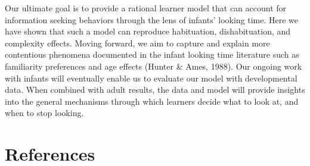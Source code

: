 \documentclass[10pt, letterpaper]{article}
\begin{document}
Our ultimate goal is to provide a rational learner model that can
account for information seeking behaviors through the lens of infants'
looking time. Here we have shown that such a model can reproduce
habituation, dishabituation, and complexity effects. Moving forward, we
aim to capture and explain more contentious phenomena documented in the
infant looking time literature such as familiarity preferences and age
effects (Hunter \& Ames, 1988). Our ongoing work with infants will
eventually enable us to evaluate our model with developmental data. When
combined with adult results, the data and model will provide insights
into the general mechanisms through which learners decide what to look
at, and when to stop looking.

\hypertarget{references}{%
\section{References}\label{references}}

\setlength{\parindent}{-0.1in} 
\setlength{\leftskip}{0.125in}

\noindent
\end{document}

